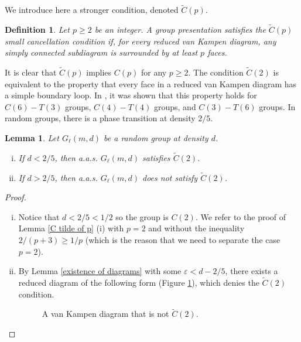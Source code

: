 \documentclass[a4paper]{article}
\def\tilde{\widetilde}
\newtheorem{defi}[thm]{Definition}
\newtheorem{lem}[thm]{Lemma}
\theoremstyle{remark}
\begin{document}
\quad

We introduce here a stronger condition, denoted $\tilde C(p)$.

\begin{defi}\label{def C tilde of p} Let $p\geq 2$ be an integer. A group presentation satisfies the $\tilde C(p)$ small cancellation condition if, for every reduced van Kampen diagram, any simply connected subdiagram is surrounded by at least $p$ faces.
\end{defi}

It is clear that $\tilde C(p)$ implies $C(p)$ for any $p\geq2$. The condition $\tilde C(2)$ is equivalent to the property that every face in a reduced van Kampen diagram has a simple boundary loop. In \cite[Ch.V, Lemma 4.1]{LS77}, it was shown that this property holds for $C(6)-T(3)$ groups, $C(4)-T(4)$ groups, and $C(3)-T(6)$ groups. In random groups, there is a phase transition at density $2/5$.

\begin{lem}\label{C tilde of 2}Let $G_\ell(m,d)$ be a random group at density $d$. 
    \begin{enumerate}[(i)]
        \item If $d<2/5$, then a.a.s. $G_\ell(m,d)$ satisfies $\tilde C(2)$.
        \item If $d>2/5$, then a.a.s. $G_\ell(m,d)$ does not satisfy $\tilde C(2)$.
    \end{enumerate}
\end{lem}
\begin{proof}\quad
    \begin{enumerate}[(i)]
        \item Notice that $d<2/5<1/2$ so the group is $C(2)$. We refer to the proof of Lemma \ref{C tilde of p} (i) with $p=2$ and without the inequality $2/(p+3)\geq 1/p$ (which is the reason that we need to separate the case $p=2$).
        \item By Lemma \ref{existence of diagrams} with some $\varepsilon<d-2/5$, there exists a reduced diagram of the following form (Figure \ref{not C tilde of 2}), which denies the $\tilde C(2)$ condition.
        
        \begin{figure}[h]
        \begin{center}
        \end{center}
            \caption{A van Kampen diagram that is not $\tilde C(2)$.}
            \label{not C tilde of 2}
        \end{figure}
    \end{enumerate}
\end{proof}
\end{document}

